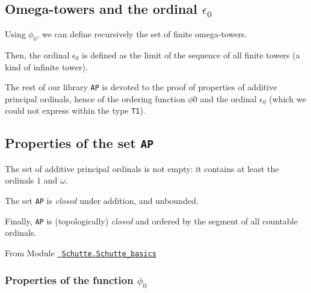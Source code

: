 \subsection{Omega-towers and the ordinal \texorpdfstring{$\epsilon_0$}{epsilon0}}


Using $\phi_0$, we can define recursively the set of finite omega-towers.





\label{sect:epsilon0-as-limit}
Then, the ordinal  $\epsilon_0$ is defined as the limit of the sequence of all finite towers (a kind of infinite tower).




The rest of our library \texttt{AP} is devoted to the proof of properties of additive principal ordinals, hence of the ordering function  $\phi0$ and the ordinal $\epsilon_0$ (which we could not express within the type \texttt{T1}).

\subsection{Properties of the set  \texttt{AP}}

The set of additive principal ordinals is not empty: it contains at least the ordinals  $1$ and  $\omega$. 


The set  \texttt{AP} is  \emph{closed} under addition, and unbounded.
\label{lemma:AP-plus-closed}





Finally, \texttt{AP} is (topologically) \emph{closed} and ordered by the segment of all countable ordinals.


From Module \href{../theories/html/hydras.Schutte.Schutte_basics.html}%
{\texttt{~Schutte.Schutte\_basics}}






\subsubsection{Properties of the function \texorpdfstring{$\phi_0$}{phi0}}
 

